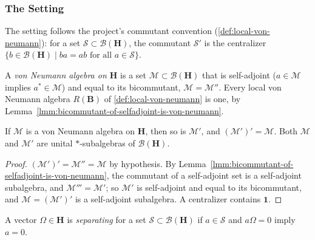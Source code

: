 \subsubsection{The Setting}

The setting follows the project's commutant convention (\ref{def:local-von-neumann}): for a set $\mathcal{S} \subset \mathcal{B}(\mathbf{H})$, the commutant $\mathcal{S}'$ is the centralizer $\{ b \in \mathcal{B}(\mathbf{H}) \mid ba = ab \text{ for all } a \in \mathcal{S} \}$.

\begin{definition}
    \label{def:von-neumann-algebra-commutant-convention}
    \leanok
    A \emph{von Neumann algebra on $\mathbf{H}$} is a set $\mathcal{M} \subset \mathcal{B}(\mathbf{H})$ that is self-adjoint ($a \in \mathcal{M}$ implies $a^* \in \mathcal{M}$) and equal to its bicommutant, $\mathcal{M} = \mathcal{M}''$. Every local von Neumann algebra $R(\mathbf{B})$ of \ref{def:local-von-neumann} is one, by Lemma~\ref{lmm:bicommutant-of-selfadjoint-is-von-neumann}.
\end{definition}

\begin{lemma}
    \label{lmm:commutant-von-neumann-algebra}
    \leanok
    If $\mathcal{M}$ is a von Neumann algebra on $\mathbf{H}$, then so is $\mathcal{M}'$, and $(\mathcal{M}')' = \mathcal{M}$. Both $\mathcal{M}$ and $\mathcal{M}'$ are unital $*$-subalgebras of $\mathcal{B}(\mathbf{H})$.
\end{lemma}
\begin{proof}
    \leanok
    $(\mathcal{M}')' = \mathcal{M}'' = \mathcal{M}$ by hypothesis. By Lemma~\ref{lmm:bicommutant-of-selfadjoint-is-von-neumann}, the commutant of a self-adjoint set is a self-adjoint subalgebra, and $\mathcal{M}''' = \mathcal{M}'$; so $\mathcal{M}'$ is self-adjoint and equal to its bicommutant, and $\mathcal{M} = (\mathcal{M}')'$ is a self-adjoint subalgebra. A centralizer contains $\mathbf{1}$.
\end{proof}

\begin{definition}
    \label{def:separating-vector}
    \leanok
    A vector $\Omega \in \mathbf{H}$ is \emph{separating} for a set $\mathcal{S} \subset \mathcal{B}(\mathbf{H})$ if $a \in \mathcal{S}$ and $a\Omega = 0$ imply $a = 0$.
\end{definition}


